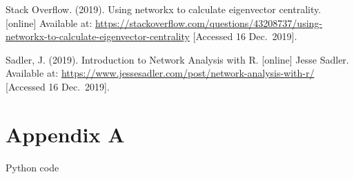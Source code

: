 \documentclass[
]{article}
\begin{document}
Stack Overflow. (2019). Using networkx to calculate eigenvector
centrality. {[}online{]} Available at:
\url{https://stackoverflow.com/questions/43208737/using-networkx-to-calculate-eigenvector-centrality}
{[}Accessed 16 Dec.~2019{]}.

Sadler, J. (2019). Introduction to Network Analysis with R. {[}online{]}
Jesse Sadler. Available at:
\url{https://www.jessesadler.com/post/network-analysis-with-r/}
{[}Accessed 16 Dec.~2019{]}.

\pagebreak

\hypertarget{appendix-a}{%
\section{Appendix A}\label{appendix-a}}

Python code
\end{document}
